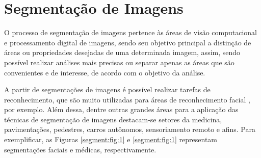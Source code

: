 \newpage
\clearpage
\section{Segmentação de Imagens}
\label{segment:image}

O processo de segmentação de imagens pertence às áreas de visão computacional e processamento digital de imagens, sendo seu objetivo principal a distinção de áreas ou propriedades desejadas \cite{Haralick1985, Yuheng2017, Ghosh2019} de uma determinada imagem, assim, sendo possível realizar análises mais precisas ou separar apenas as áreas que são convenientes e de interesse, de acordo com o objetivo da análise.

A partir de segmentações de imagens é possível realizar tarefas de reconhecimento, que são muito utilizadas para áreas de reconhecimento facial \cite{Yuheng2017}, por exemplo. Além dessa, dentre outras grandes áreas para a aplicação das técnicas de segmentação de imagens destacam-se setores da medicina, pavimentações, pedestres, carros autônomos, sensoriamento remoto e afins. Para exemplificar, as Figuras \ref{segment:fig:1} e \ref{segment:fig:1} representam segmentações faciais e médicas, respectivamente.  

